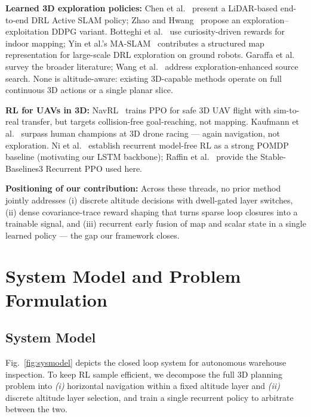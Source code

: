 \documentclass[conference]{IEEEtran}
\begin{document}
\textbf{Learned 3D exploration policies:} Chen et al.~\cite{chen2024lidar} present a LiDAR-based end-to-end DRL Active SLAM policy; Zhao and Hwang~\cite{zhao2024ddpg} propose an exploration--exploitation DDPG variant. Botteghi et al.~\cite{botteghi2021curiosity} use curiosity-driven rewards for indoor mapping; Yin et al.'s MA-SLAM~\cite{yin2025maslam} contributes a structured map representation for large-scale DRL exploration on ground robots. Garaffa et al.~\cite{garaffa2023survey} survey the broader literature; Wang et al.~\cite{wang2024exploration} address exploration-enhanced source search. None is altitude-aware: existing 3D-capable methods operate on full continuous 3D actions or a single planar slice.

\textbf{RL for UAVs in 3D:} NavRL~\cite{xu2025navrl} trains PPO for safe 3D UAV flight with sim-to-real transfer, but targets collision-free goal-reaching, not mapping. Kaufmann et al.~\cite{kaufmann2023racing} surpass human champions at 3D drone racing --- again navigation, not exploration. Ni et al.~\cite{ni2022recurrent} establish recurrent model-free RL as a strong POMDP baseline (motivating our LSTM backbone); Raffin et al.~\cite{raffin2021sb3} provide the Stable-Baselines3 Recurrent PPO used here.

\textbf{Positioning of our contribution:} Across these threads, no prior method jointly addresses (i) discrete altitude decisions with dwell-gated layer switches, (ii) dense covariance-trace reward shaping that turns sparse loop closures into a trainable signal, and (iii) recurrent early fusion of map and scalar state in a single learned policy --- the gap our framework closes.

\section{System Model and Problem Formulation}

\subsection{System Model}

Fig.~\ref{fig:sysmodel} depicts the closed loop system for autonomous warehouse inspection. To keep RL sample efficient, we decompose the full 3D planning problem into \emph{(i)} horizontal navigation within a fixed altitude layer and \emph{(ii)} discrete altitude layer selection, and train a single recurrent policy to arbitrate between the two.
\end{document}
